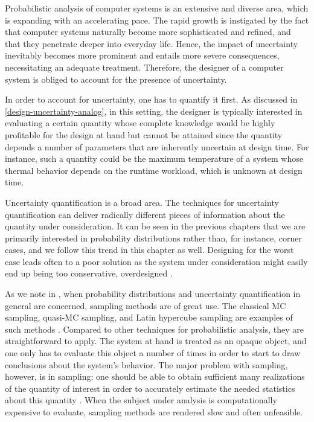Probabilistic analysis of computer systems is an extensive and diverse area,
which is expanding with an accelerating pace. The rapid growth is instigated by
the fact that computer systems naturally become more sophisticated and refined,
and that they penetrate deeper into everyday life. Hence, the impact of
uncertainty inevitably becomes more prominent and entails more severe
consequences, necessitating an adequate treatment. Therefore, the designer of a
computer system is obliged to account for the presence of uncertainty.

In order to account for uncertainty, one has to quantify it first. As discussed
in \cref{design-uncertainty-analog}, in this setting, the designer is typically
interested in evaluating a certain quantity whose complete knowledge would be
highly profitable for the design at hand but cannot be attained since the
quantity depends a number of parameters that are inherently uncertain at design
time. For instance, such a quantity could be the maximum temperature of a system
whose thermal behavior depends on the runtime workload, which is unknown at
design time.

Uncertainty quantification \cite{maitre2010} is a broad area. The techniques for
uncertainty quantification can deliver radically different pieces of information
about the quantity under consideration. It can be seen in the previous chapters
that we are primarily interested in probability distributions rather than, for
instance, corner cases, and we follow this trend in this chapter as well.
Designing for the worst case leads often to a poor solution as the system under
consideration might easily end up being too conservative, overdesigned
\cite{quinton2012}.

As we note in , when probability distributions and uncertainty
quantification in general are concerned, sampling methods are of great use. The
classical \acf{MC} sampling, quasi-\ac{MC} sampling, and Latin hypercube
sampling are examples of such methods \cite{asmussen2007}. Compared to other
techniques for probabilistic analysis, they are straightforward to apply. The
system at hand is treated as an opaque object, and one only has to evaluate this
object a number of times in order to start to draw conclusions about the
system's behavior. The major problem with sampling, however, is in sampling: one
should be able to obtain sufficient many realizations of the quantity of
interest in order to accurately estimate the needed statistics about this
quantity \cite{diaz-emparanza2002}. When the subject under analysis is
computationally expensive to evaluate, sampling methods are rendered slow and
often unfeasible.

